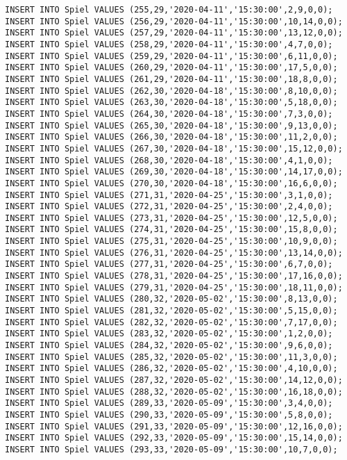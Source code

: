 \documentclass{bschlangaul-aufgabe}
\begin{document}
\begin{verbatim}
INSERT INTO Spiel VALUES (255,29,'2020-04-11','15:30:00',2,9,0,0);
INSERT INTO Spiel VALUES (256,29,'2020-04-11','15:30:00',10,14,0,0);
INSERT INTO Spiel VALUES (257,29,'2020-04-11','15:30:00',13,12,0,0);
INSERT INTO Spiel VALUES (258,29,'2020-04-11','15:30:00',4,7,0,0);
INSERT INTO Spiel VALUES (259,29,'2020-04-11','15:30:00',6,11,0,0);
INSERT INTO Spiel VALUES (260,29,'2020-04-11','15:30:00',17,5,0,0);
INSERT INTO Spiel VALUES (261,29,'2020-04-11','15:30:00',18,8,0,0);
INSERT INTO Spiel VALUES (262,30,'2020-04-18','15:30:00',8,10,0,0);
INSERT INTO Spiel VALUES (263,30,'2020-04-18','15:30:00',5,18,0,0);
INSERT INTO Spiel VALUES (264,30,'2020-04-18','15:30:00',7,3,0,0);
INSERT INTO Spiel VALUES (265,30,'2020-04-18','15:30:00',9,13,0,0);
INSERT INTO Spiel VALUES (266,30,'2020-04-18','15:30:00',11,2,0,0);
INSERT INTO Spiel VALUES (267,30,'2020-04-18','15:30:00',15,12,0,0);
INSERT INTO Spiel VALUES (268,30,'2020-04-18','15:30:00',4,1,0,0);
INSERT INTO Spiel VALUES (269,30,'2020-04-18','15:30:00',14,17,0,0);
INSERT INTO Spiel VALUES (270,30,'2020-04-18','15:30:00',16,6,0,0);
INSERT INTO Spiel VALUES (271,31,'2020-04-25','15:30:00',3,1,0,0);
INSERT INTO Spiel VALUES (272,31,'2020-04-25','15:30:00',2,4,0,0);
INSERT INTO Spiel VALUES (273,31,'2020-04-25','15:30:00',12,5,0,0);
INSERT INTO Spiel VALUES (274,31,'2020-04-25','15:30:00',15,8,0,0);
INSERT INTO Spiel VALUES (275,31,'2020-04-25','15:30:00',10,9,0,0);
INSERT INTO Spiel VALUES (276,31,'2020-04-25','15:30:00',13,14,0,0);
INSERT INTO Spiel VALUES (277,31,'2020-04-25','15:30:00',6,7,0,0);
INSERT INTO Spiel VALUES (278,31,'2020-04-25','15:30:00',17,16,0,0);
INSERT INTO Spiel VALUES (279,31,'2020-04-25','15:30:00',18,11,0,0);
INSERT INTO Spiel VALUES (280,32,'2020-05-02','15:30:00',8,13,0,0);
INSERT INTO Spiel VALUES (281,32,'2020-05-02','15:30:00',5,15,0,0);
INSERT INTO Spiel VALUES (282,32,'2020-05-02','15:30:00',7,17,0,0);
INSERT INTO Spiel VALUES (283,32,'2020-05-02','15:30:00',1,2,0,0);
INSERT INTO Spiel VALUES (284,32,'2020-05-02','15:30:00',9,6,0,0);
INSERT INTO Spiel VALUES (285,32,'2020-05-02','15:30:00',11,3,0,0);
INSERT INTO Spiel VALUES (286,32,'2020-05-02','15:30:00',4,10,0,0);
INSERT INTO Spiel VALUES (287,32,'2020-05-02','15:30:00',14,12,0,0);
INSERT INTO Spiel VALUES (288,32,'2020-05-02','15:30:00',16,18,0,0);
INSERT INTO Spiel VALUES (289,33,'2020-05-09','15:30:00',3,4,0,0);
INSERT INTO Spiel VALUES (290,33,'2020-05-09','15:30:00',5,8,0,0);
INSERT INTO Spiel VALUES (291,33,'2020-05-09','15:30:00',12,16,0,0);
INSERT INTO Spiel VALUES (292,33,'2020-05-09','15:30:00',15,14,0,0);
INSERT INTO Spiel VALUES (293,33,'2020-05-09','15:30:00',10,7,0,0);

\end{verbatim}
\end{document}
